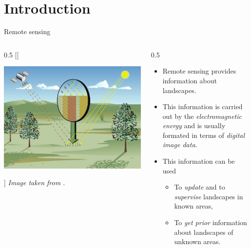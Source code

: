 \documentclass[10pt,aspectratio=1610]{beamer}
\begin{document}
\section{Introduction}
\label{sec:orgdca8443}
\begin{frame}[label={sec:orge91be9e}]{Remote sensing}
\begin{columns}
\begin{column}{0.5\columnwidth}
[[\begin{center}
\includegraphics[width=\linewidth]{./figures/remote_sensing_acquisition.png}
\end{center}]
\emph{Image taken from \cite{974727}}.
\end{column}
\begin{column}{0.5\columnwidth}
\begin{itemize}
\item Remote   sensing  provides   information   about  landscapes.
\item This information is carried out by the \emph{electromagnetic energy} and is
usually formated in terms of \emph{digital image data}.
\item This information can be used
\begin{itemize}
\item To \emph{update} and to \emph{supervise} landscapes in known areas,
\item To \emph{get prior} information about landscapes of unknown areas.
\end{itemize}
\end{itemize}
\end{column}
\end{columns}
\end{frame}
\end{document}
